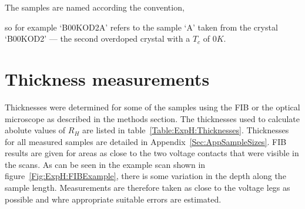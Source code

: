 The samples are named according the convention,
\begin{quote}
\end{quote}
so for example `B00KOD2A' refers to the sample `A' taken from the crystal `B00KOD2' --- the second overdoped crystal with a $T_c$ of $\unit{0}{K}$.

\section{Thickness measurements}

Thicknesses were determined for some of the samples using the \ac{FIB} or the optical microscope as described in the methods section. The thicknesses used to calculate abolute values of $R_H$ are listed in table~\ref{Table:ExpH:Thicknesses}. Thicknesses for all measured samples are detailed in Appendix~\ref{Sec:AppSampleSizes}. \ac{FIB} results are given for areas as close to the two voltage contacts that were visible in the scans. As can be seen in the example scan shown in figure~\ref{Fig:ExpH:FIBExample}, there is some variation in the depth along the sample length. Measurements are therefore taken as close to the voltage legs as possible and whre appropriate suitable errors are estimated.
